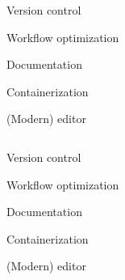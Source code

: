\documentclass[usenames,dvipsnames]{beamer}
\theoremstyle{plain}
\theoremstyle{definition}
\begin{document}

\begin{frame}{\setframetitle{}}
  
  \begin{columns}[t]
    
    \begin{itemize}
      \item \textcolor{bg!85!normal text.fg}{Version control
      \item Workflow optimization  } 
      \item Documentation
      \textcolor{bg!85!normal text.fg}
      {\item Containerization
      \item (Modern) editor} 
    \end{itemize}
    
    \begin{figure}
      {}
    \end{figure}
  \end{columns}
  
\end{frame}




\begin{frame}{\setframetitle{}}
  
  \begin{columns}[t]
    
    \begin{itemize}
      \item \textcolor{bg!85!normal text.fg}{Version control
      \item Workflow optimization   
      \item Documentation}
      \item Containerization  
      \textcolor{bg!85!normal text.fg}
      {\item (Modern) editor} 
    \end{itemize}
    
    \begin{figure}
      {}
    \end{figure}
  \end{columns}
  
\end{frame}
\end{document}
